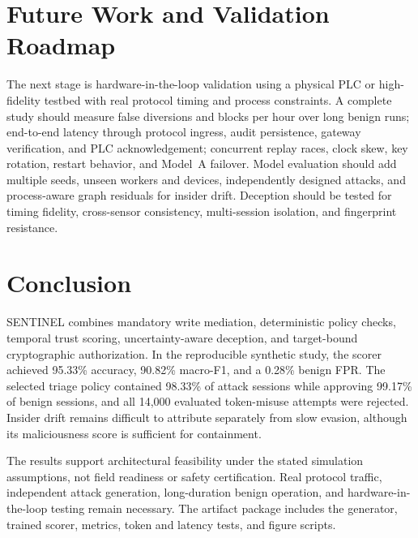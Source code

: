 \documentclass[journal]{IEEEtran}
\begin{document}
\section{Future Work and Validation Roadmap}
The next stage is hardware-in-the-loop validation using a physical PLC or high-fidelity testbed with real protocol timing and process constraints. A complete study should measure false diversions and blocks per hour over long benign runs; end-to-end latency through protocol ingress, audit persistence, gateway verification, and PLC acknowledgement; concurrent replay races, clock skew, key rotation, restart behavior, and Model~A failover. Model evaluation should add multiple seeds, unseen workers and devices, independently designed attacks, and process-aware graph residuals for insider drift. Deception should be tested for timing fidelity, cross-sensor consistency, multi-session isolation, and fingerprint resistance.

\section{Conclusion}
SENTINEL combines mandatory write mediation, deterministic policy checks, temporal trust scoring, uncertainty-aware deception, and target-bound cryptographic authorization. In the reproducible synthetic study, the scorer achieved 95.33\% accuracy, 90.82\% macro-F1, and a 0.28\% benign FPR. The selected triage policy contained 98.33\% of attack sessions while approving 99.17\% of benign sessions, and all 14,000 evaluated token-misuse attempts were rejected. Insider drift remains difficult to attribute separately from slow evasion, although its maliciousness score is sufficient for containment.

The results support architectural feasibility under the stated simulation assumptions, not field readiness or safety certification. Real protocol traffic, independent attack generation, long-duration benign operation, and hardware-in-the-loop testing remain necessary. The artifact package includes the generator, trained scorer, metrics, token and latency tests, and figure scripts.
\end{document}
